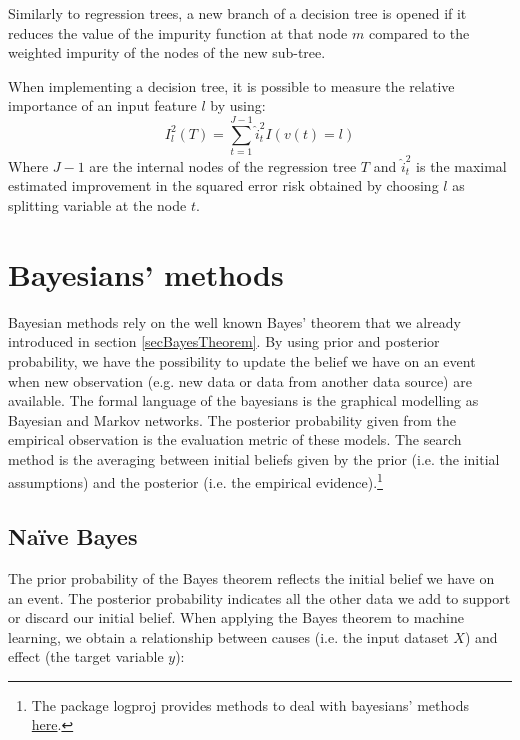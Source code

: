 Similarly to regression trees, a new branch of a decision tree is opened if it reduces the value of the impurity function at that node $m$ compared to the weighted impurity of the nodes of the new sub-tree.\par

When implementing a decision tree, it is possible to measure the relative importance of an input feature $l$ by using:
\begin{equation}
        I_l^2\left(T\right)=\sum_{t=1}^{J-1}{{\hat{i}}_t^2I\left(v\left(t\right)=l\right)}
        \label{eq_decisionTree6}
\end{equation}
Where $J-1$ are the internal nodes of the regression tree $T$ and ${\hat{i}}_t^2$ is the maximal estimated improvement in the squared error risk obtained by choosing $l$ as splitting variable at the node $t$. 

\section{Bayesians’ methods} \label{secBayesianMethods}

Bayesian methods rely on the well known Bayes' theorem that we already introduced in section \ref{secBayesTheorem}. By using prior and posterior probability, we have the possibility to update the belief we have on an event when new observation (e.g. new data or data from another data source) are available. The formal language of the bayesians is the graphical modelling as Bayesian and Markov networks. The posterior probability given from the empirical observation is the evaluation metric of these models. The search method is the averaging between initial beliefs given by the prior (i.e. the initial assumptions) and the posterior (i.e. the empirical evidence).\footnote{The package logproj provides methods to deal with bayesians' methods \href{https://github.com/aletuf93/logproj/blob/master/logproj/M_learningMethod/bayesians_models.py}{here}.}

\subsection{Naïve Bayes}
The prior probability of the Bayes theorem reflects the initial belief we have on an event. The posterior probability indicates all the other data we add to support or discard our initial belief. When applying the Bayes theorem to machine learning, we obtain a relationship between causes (i.e. the input dataset $X$) and effect (the target variable $y$):

